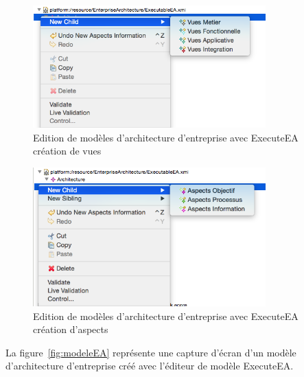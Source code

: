     \begin{figure}[!htbp]
     \begin{center}
      \includegraphics[width=0.8\textwidth]{figures/5_implementation/editeur_modele1.png}
     \end{center}
     \caption{Edition de modèles d'architecture d'entreprise avec ExecuteEA\\création de vues}
     \label{fig:editeur_modele1}
    \end{figure}

    \begin{figure}[!htbp]
     \begin{center}
      \includegraphics[width=0.8\textwidth]{figures/5_implementation/editeur_modele2.png}
     \end{center}
     \caption{Edition de modèles d'architecture d'entreprise avec ExecuteEA\\création d'aspects}
     \label{fig:editeur_modele2}
    \end{figure}

    La figure~\ref{fig:modeleEA} représente une capture d'écran d'un modèle d'architecture
    d'entreprise créé avec l'éditeur de modèle ExecuteEA.

